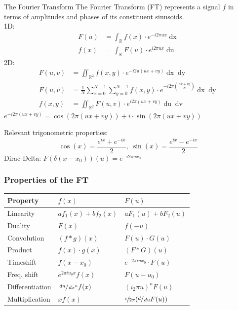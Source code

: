 \documentclass[a4paper,10pt]{article}
\renewcommand*{\arraystretch}{2}
\begin{document}
\begin{mainbox}{The Fourier Transform}	
    The Fourier Transform (FT) represents a signal \( f \) in terms of amplitudes and phases of its constituent sinusoids.\\
    1D:
    \begin{align*}
	F(u) &= \int_\mathbb{R} f(x) \cdot e^{-i2\pi ux} \mathop{dx} \\
	f(x) &= \int_\mathbb{R} F(u) \cdot e^{i 2\pi ux} \mathop{du} \tag{inverse}
    \end{align*}
    2D: 
    \begin{align*}
	F(u,v) &= \iint_{\mathbb{R}^2} f(x,y) \cdot e^{-i2\pi(ux + vy)} \mathop{dx} \mathop{dy} \\
	F(u,v) &= \frac{1}{N} \sum^{N-1}_{x=0} \sum^{N-1}_{y=0} f(x,y) \cdot e^{-i2\pi (\frac{ux+vy}{N})} \mathop{dx}\mathop{dy} \\
	f(x,y) &= \iint_{\mathbb{R}^2} F(u,v) \cdot e^{i 2\pi (ux+vy)} \mathop{du}\mathop{dv} \tag{inverse}
    \end{align*} 
    \( e^{-i2\pi (ux+vy)} = \cos (2\pi (ux+vy)) + i \cdot \sin(2\pi (ux + vy)) \)
\end{mainbox}
Relevant trigonometric properties:
\[\cos(x) = \frac{e^{ix} + e^{-ix}}{2},\; \sin(x) = \frac{e^{ix}-e^{-ix}}{2} \]
Dirac-Delta: \( F(\delta(x-x_{0}))(u) = e^{-i 2\pi ux_{0}} \)

\subsubsection{Properties of the FT}
\begin{center}
    {\renewcommand{\arraystretch}{1.2}
    \begin{tabularx}{\linewidth}{Xll}
	\toprule
	Property & \( f(x) \) & \( F(u) \) \\
	\midrule
	Linearity & \( af_{1}(x) + bf_{2}(x) \) & \( aF_{1}(u) + bF_{2}(u) \) \\
	Duality & \( F(x) \) & \( f(-u) \) \\
	Convolution & \( (f*g)(x) \) & \( F(u) \cdot G(u) \) \\
	Product & \( f(x) \cdot g(x) \) & \( (F*G)(u) \) \\
	Timeshift & \( f(x -x_{0}) \) & \( e^{-2\pi i ux_{0}} \cdot F(u) \) \\
	Freq. shift & \( e^{2\pi i u_{0}x} f(x) \) & \( F(u - u_{0}) \) \\
	Differentiation & \( \sfrac{\mathop{dn}}{\mathop{dx^n}} f(x) \) & \( (i_{2}\pi u)^n F(u) \) \\
	Multiplication & \( xf(x) \) & \( \sfrac{i}{2\pi } (\sfrac{d}{\mathop{du}} F(u)) \) \\
	\bottomrule
    \end{tabularx}
    }
\end{center}
\end{document}
